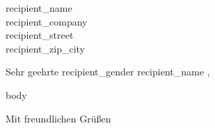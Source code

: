 \documentclass[11pt]{scrlttr2}
\begin{document}
\begin{letter}{{{ recipient_name }}\\{{{ recipient_company }}}\\{{{ recipient_street }}}\\{{{ recipient_zip_city }}}}
\opening{Sehr geehrte{{ recipient_gender }} {{{ recipient_name }}},}

{{{ body }}}

\closing{Mit freundlichen Grüßen}

\end{letter}
\end{document}
